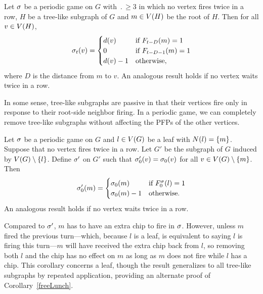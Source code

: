 \begin{cor}
Let $\s$ be a periodic game on $G$ with $\period \geq 3$ in which no vertex
fires twice in a row, $H$ be a tree-like subgraph of $G$ and $m \in \V[H]$ be
the root of $H$. Then for all $v \in \V[H]$,
\[
  \chips{v}{t} = \begin{cases}
    \deg{v} & \textnormal{if } \firing{m}{t-D} = 1 \\
    0 & \textnormal{if } \firing{m}{t-D-1} = 1 \\
    \deg{v} - 1 & \textnormal{otherwise},
  \end{cases}
\]
where $D$ is the distance from $m$ to $v$. An analogous result holds if no
vertex waits twice in a row.
\end{cor}

In some sense, tree-like subgraphs are passive in that their vertices fire only
in response to their root-side neighbor firing. In a periodic game, we can
completely remove tree-like subgraphs without affecting the PFPs of the other
vertices.

\begin{cor}
Let $\s$ be a periodic game on $G$ and $l \in \V$ be a leaf with $\N{l} =
\{m\}$. Suppose that no vertex fires twice in a row. Let $G'$ be the subgraph
of $G$ induced by $\V \setminus \{l\}$. Define $\s'$ on $G'$ such that
$\chips[\s']{v}{0} = \chips{v}{0}$ for all $v \in \V \setminus \{m\}$. Then
\[
  \chips[\s']{m}{0} = \begin{cases}
    \chips{m}{0} &\textnormal{if }\showhere{\firing{l}{0}} = 1 \\
    \chips{m}{0} - 1 &\textnormal{otherwise}.
  \end{cases}
\]
An analogous result holds if no vertex waits twice in a row.
\end{cor}

Compared to $\s'$, $m$ has to have an extra chip to fire in $\s$. However,
unless $m$ fired the previous turn---which, because $l$ is a leaf, is
equivalent to saying $l$ is firing this turn---$m$ will have received the extra
chip back from $l$, so removing both $l$ and the chip has no effect on $m$ as
long as $m$ does not fire while $l$ has a chip. This corollary concerns a leaf,
though the result generalizes to all tree-like subgraphs by repeated
application, providing an alternate proof of Corollary~\ref{freeLunch}.
